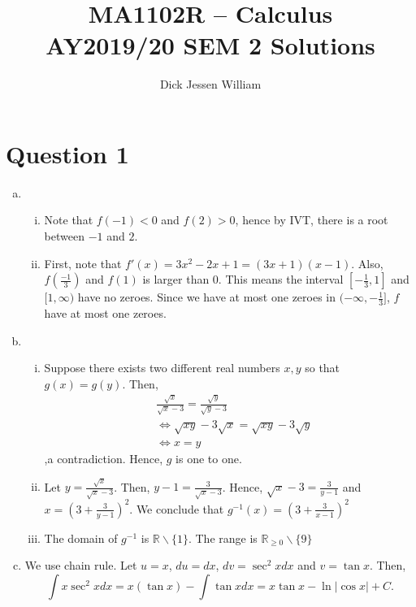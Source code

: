 \documentclass[12pt,a4paper]{article}
\author{Dick Jessen William}
\title{MA1102R -- Calculus \\ AY2019/20 SEM 2 Solutions}
\begin{document}
	
	\maketitle
	
	\section*{Question 1}
	
	\begin{enumerate}[a.]
	    \item \begin{enumerate}[i.]
	     \item Note that $f(-1)<0$ and $f(2)>0$, hence by IVT, there is a root between $-1$ and $2$.
	    \item First, note that $f'(x) = 3x^2-2x+1 = (3x+1)(x-1)$. Also, $f(\frac{-1}{3})$ and $f(1)$ is larger than 0. This means the interval $[-\frac{1}{3},1]$ and $[1,\infty)$ have no zeroes. Since we have at most one zeroes in $(-\infty,-\frac{1}{3}]$, $f$ have at most one zeroes.
	    \end{enumerate}
	    \item
	    \begin{enumerate}[i.]
	    \item Suppose there exists two different real numbers $x,y$ so that $g(x)=g(y)$. Then,
	    \begin{align*}
	    &\frac{\sqrt{x}}{\sqrt{x}-3} = \frac{\sqrt{y}}{\sqrt{y}-3} \\
	     &\iff \sqrt{xy}-3\sqrt{x} = \sqrt{xy}-3\sqrt{y} \\
	     &\iff x = y
	    \end{align*},a contradiction. Hence, $g$ is one to one.
	    \item Let $y = \frac{\sqrt{x}}{\sqrt{x}-3}$. Then, $y-1 = \frac{3}{\sqrt{x}-3}$. Hence, $\sqrt{x}-3 = \frac{3}{y-1}$ and $x = \left( 3+\frac{3}{y-1} \right)^2$. We conclude that $g^{-1}(x) = \left( 3+\frac{3}{x-1} \right)^2$
	    \item The domain of $g^{-1}$ is $\mathbb{R} \backslash \{ 1 \}$. The range is $\mathbb{R}_{\geq 0 } \backslash \{ 9 \}$
	    \end{enumerate}
	    \item We use chain rule. Let $u = x$, $du=dx$, $dv = \sec^2{x} dx$ and $v = \tan{x}$. Then, $$\int x \sec^2{x} dx = x(\tan{x}) -\int \tan{x} dx = x\tan{x}-\ln{|\cos{x}|} +C.$$
	\end{enumerate}
\end{document}
